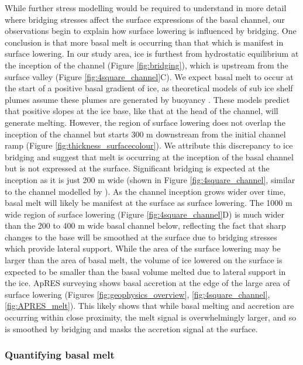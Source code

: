 While further stress modelling would be required to understand in more detail where bridging stresses affect the surface expressions of the basal channel, our observations begin to explain how surface lowering is influenced by bridging. One conclusion is that more basal melt is occurring than that which is manifest in surface lowering. %
In our study area, ice is furthest from hydrostatic equilibrium at the inception of the channel (Figure \ref{fig:bridging}), which is upstream from the surface valley (Figure \ref{fig:4square_channel}C). 
We expect basal melt to occur at the start of a positive basal gradient of ice, as theoretical models \cite [e.g.][] {jenkins2011convection} of sub ice shelf plumes assume these plumes are generated by buoyancy \citep{jenkins1991one}. These models predict that positive slopes at the ice base, like that at the head of the channel, will generate melting. 
However, the region of surface lowering does not overlap the inception of the channel but starts 300 m downstream from the initial channel ramp (Figure \ref{fig:thickness_surfacecolour}). 
We attribute this discrepancy to ice bridging and suggest that melt is occurring at the inception of the basal channel but is not expressed at the surface. Significant bridging is expected at the inception as it is just 200 m wide (shown in Figure \ref{fig:4square_channel}, similar to the channel modelled by \cite{drews2015evolution}). As the channel inception grows wider over time, basal melt will likely be manifest at the surface as surface lowering. 
The 1000 m wide region of surface lowering (Figure \ref{fig:4square_channel}D) is much wider than the 200 to 400 m wide basal channel below, reflecting the fact that sharp changes to the base will be smoothed at the surface due to bridging  stresses which provide lateral support. While the area of the surface lowering may be larger than the area of basal melt, the volume of ice lowered on the surface is expected to be smaller than the basal volume melted due to lateral support in the ice.
ApRES surveying shows basal accretion at the edge of the large area of surface lowering (Figures \ref{fig:geophysics_overview}, \ref{fig:4square_channel}, \ref{fig:APRES_melt}). This likely shows that while basal melting and accretion are occurring within close proximity, the melt signal is overwhelmingly larger, and so is smoothed by bridging and masks the accretion signal at the surface.

\subsubsection{Quantifying basal melt} \label{sec:melt}


